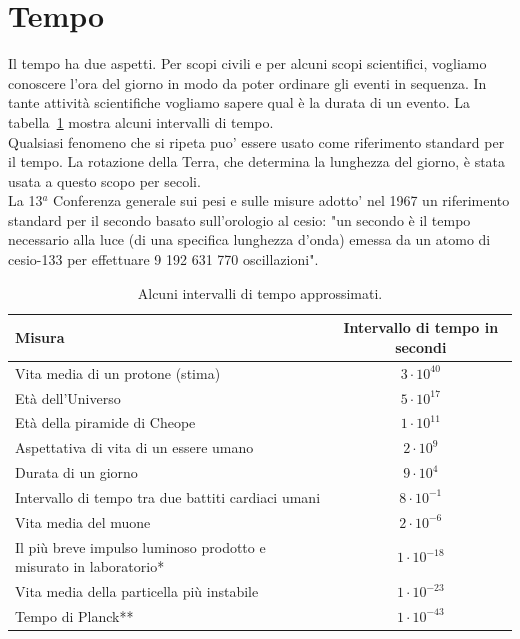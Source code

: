 \documentclass[12pt]{report}
\begin{document}
	\section{Tempo}
	Il tempo ha due aspetti. Per scopi civili e per alcuni scopi scientifici, vogliamo conoscere l'ora del giorno in modo da poter ordinare gli eventi in sequenza. In tante attività scientifiche vogliamo sapere qual è  la durata di un evento.
	La tabella~\ref{tab:intervalli_tempo} mostra alcuni intervalli di tempo. \\
	Qualsiasi fenomeno che si ripeta puo' essere usato come riferimento standard per il tempo. La rotazione della Terra, che determina la lunghezza del giorno, è  stata usata a questo scopo per secoli. \\
	La 13$^a$ Conferenza generale sui pesi e sulle misure adotto' nel 1967 un riferimento standard per il secondo basato sull'orologio al cesio: "un secondo è  il tempo necessario alla luce (di una specifica lunghezza d'onda) emessa da un atomo di cesio-133 per effettuare 9 192 631 770 oscillazioni".
	\begin{table}[H]
		\centering
		\caption{Alcuni intervalli di tempo approssimati.}
		\label{tab:intervalli_tempo}
		\begin{tabular}{@{}p{8cm} c@{}}
			\hline
			\textbf{Misura} & \textbf{Intervallo di tempo in secondi} \\
			\hline
			Vita media di un protone (stima) & $3 \cdot 10^{40}$ \\
			Età dell'Universo & $5 \cdot 10^{17}$ \\
			Età della piramide di Cheope & $1 \cdot 10^{11}$ \\
			Aspettativa di vita di un essere umano & $2 \cdot 10^{9}$ \\
			Durata di un giorno & $9 \cdot 10^{4}$ \\
			Intervallo di tempo tra due battiti cardiaci umani & $8 \cdot 10^{-1}$ \\
			Vita media del muone & $2 \cdot 10^{-6}$ \\
			Il più breve impulso luminoso prodotto e misurato in laboratorio* & $1 \cdot 10^{-18}$ \\
			Vita media della particella più instabile & $1 \cdot 10^{-23}$ \\
			Tempo di Planck** & $1 \cdot 10^{-43}$ \\
			\hline
		\end{tabular}
	\end{table}
\end{document}
